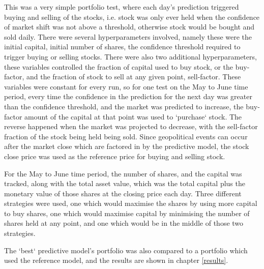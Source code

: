 This was a very simple portfolio test, where each day's prediction triggered buying and selling of the stocks, i.e. stock was only ever held when the confidence of market shift was not above a threshold, otherwise stock would be bought and sold daily. There were several hyperparameters involved, namely these were the initial capital, initial number of shares, the confidence threshold required to trigger buying or selling stocks. There were also two additional hyperparameters, these variables controlled the fraction of capital used to buy stock, or the buy-factor, and the fraction of stock to sell at any given point, sell-factor. These variables were constant for every run, so for one test on the May to June time period, every time the confidence in the prediction for the next day was greater than the confidence threshold, and the market was predicted to increase, the buy-factor amount of the capital at that point was used to `purchase` stock. The reverse happened when the market was projected to decrease, with the sell-factor fraction of the stock being held being sold. Since geopolitical events can occur after the market close which are factored in by the predictive model, the stock close price was used as the reference price for buying and selling stock. 

For the May to June time period, the number of shares, and the capital was tracked, along with the total asset value, which was the total capital plus the monetary value of those shares at the closing price each day. Three different strategies were used, one which would maximise the shares by using more capital to buy shares, one which would maximise capital by minimising the number of shares held at any point, and one which would be in the middle of those two strategies.

The `best` predictive model's portfolio was also compared to a portfolio which used the reference model, and the results are shown in chapter \ref{results}.
